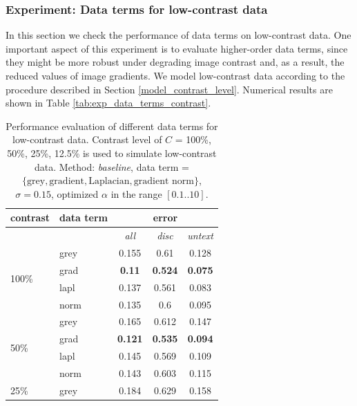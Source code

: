 \subsubsection{Experiment: Data terms for low-contrast data}
\label{experiment_data_terms_for_contrast_data}

In this section we check the performance of data terms on low-contrast data. One important aspect of this experiment is to evaluate higher-order data terms, since they might be more robust under degrading image contrast and, as a result, the reduced values of image gradients. We model low-contrast data according to the procedure described in Section \ref{model_contrast_level}.  Numerical results are shown in Table \ref{tab:exp_data_terms_contrast}.


\begin{table}[ht] \scriptsize
  \centering
  \caption{Performance evaluation of different data terms for low-contrast data. Contrast level of $C$ = 100\%, 50\%, 25\%, 12.5\% is used to simulate low-contrast data. Method: \textit{baseline}, data term = $\lbrace \text{grey},  \text{gradient}, \text{Laplacian}, \text{gradient norm} \rbrace$, $\sigma=0.15$,  optimized $\alpha$ in the range $[0.1 .. 10]$.}
    \begin{tabular}{clccc}
    \toprule
    \multicolumn{1}{c}{contrast} & \multicolumn{1}{c}{data term} & \multicolumn{3}{c}{error} \\
    \midrule
          &       & \multicolumn{1}{c}{\textit{all}} & \multicolumn{1}{c}{\textit{disc}} & \multicolumn{1}{c}{\textit{untext}} \\
          \midrule
          \midrule
    \multicolumn{1}{l}{\multirow{4}[1]{*}{100\%}} & grey  & 0.155 & 0.61  & 0.128 \\
          & grad  & \textbf{0.11} & \textbf{0.524} & \textbf{0.075} \\
          & lapl  & 0.137 & 0.561 & 0.083 \\
          & norm  & 0.135 & 0.6   & 0.095 \\
          \midrule
    \multicolumn{1}{l}{\multirow{4}[2]{*}{50\%}} & grey  & 0.165 & 0.612 & 0.147 \\
          & grad  & \textbf{0.121} & \textbf{0.535} & \textbf{0.094} \\
          & lapl  & 0.145 & 0.569 & 0.109 \\
          & norm  & 0.143 & 0.603 & 0.115 \\
          \midrule
    \multicolumn{1}{l}{\multirow{4}[2]{*}{25\%}} & grey  & 0.184 & 0.629 & 0.158 \\

\end{tabular}
\end{table}
